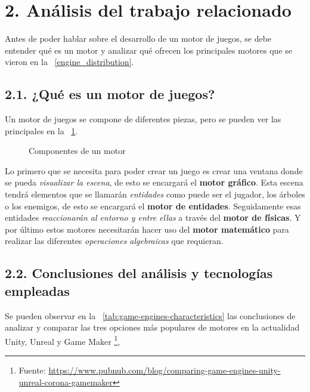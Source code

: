 \chapter*{2. Análisis del trabajo relacionado}\label{cap:analysis}

Antes de poder hablar sobre el desarrollo de un motor de juegos, se debe entender qué es un motor y analizar qué ofrecen los principales
motores que se vieron en la \figurename~\ref{engine_distribution}. 

\section*{2.1. ¿Qué es un motor de juegos?}\label{sec:game-engine}

Un motor de juegos se compone de diferentes piezas, pero se pueden ver las principales en la \figurename~\ref{engine_components}.

\begin{figure}[h!]
    \centering
    \caption{Componentes de un motor}
    \label{engine_components}
\end{figure}

Lo primero que se necesita para poder crear un juego es crear una ventana donde se pueda \textit{visualizar la escena}, 
de esto se encargará el \textbf{motor gráfico}. Esta escena tendrá elementos que se llamarán \textit{entidades} como puede ser el jugador,
los árboles o los enemigos, de esto se encargará el \textbf{motor de entidades}. Seguidamente esas entidades \textit{reaccionarán al
entorno y entre ellas} a través del \textbf{motor de físicas}. Y por último estos motores necesitarán hacer uso del \textbf{motor matemático}
para realizar las diferentes \textit{operaciones algebraicas} que requieran.

\newpage

\section*{2.2. Conclusiones del análisis y tecnologías empleadas}\label{sec:technologies}

Se pueden observar en la \tablename~\ref{tab:game-engines-characteristics} las conclusiones de analizar y comparar las tres opciones más populares de motores en la actualidad Unity\cite{unity}, Unreal\cite{unreal} y Game Maker\cite{gamemaker} \footnote{Fuente: \url{https://www.pubnub.com/blog/comparing-game-engines-unity-unreal-corona-gamemaker}}, 

